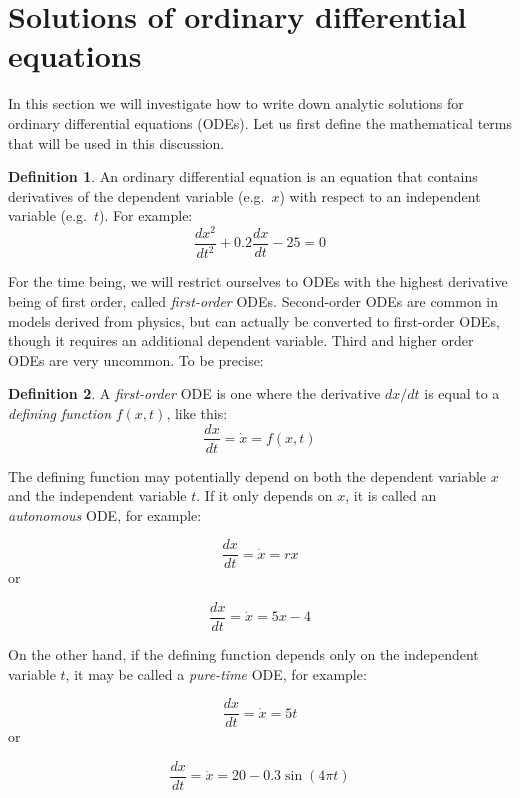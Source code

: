 \documentclass[
]{book}
\theoremstyle{definition}
\newtheorem{definition}{Definition}[chapter]
\theoremstyle{definition}
\theoremstyle{definition}
\theoremstyle{remark}
\begin{document}
\hypertarget{solutions-of-ordinary-differential-equations}{%
\section{Solutions of ordinary differential equations}\label{solutions-of-ordinary-differential-equations}}

\label{sec:math15}

In this section we will investigate how to write down analytic solutions for ordinary differential equations (ODEs). Let us first define the mathematical terms that will be used in this discussion.

\begin{definition}
\protect\hypertarget{def:def-ode}{}{\label{def:def-ode} }An ordinary differential equation is an equation that contains derivatives of the  dependent variable (e.g.~\(x\)) with respect to an independent variable (e.g.~\(t\)). For example:
\[ \frac{dx^2}{dt^2}+ 0.2 \frac{dx}{dt} - 25 = 0 \]
\end{definition}

For the time being, we will restrict ourselves to ODEs with the highest derivative being of first order, called \emph{first-order} ODEs. Second-order ODEs are common in models derived from physics, but can actually be converted to first-order ODEs, though it requires an additional dependent variable. Third and higher order ODEs are very uncommon. To be precise:
\begin{definition}
\protect\hypertarget{def:def-firstode}{}{\label{def:def-firstode} }A \emph{first-order} ODE is one where the derivative \(dx/dt\) is equal to a \emph{defining function} \(f(x,t)\), like this:
\[\frac{dx} {dt} = \dot x = f(x,t)\]
\end{definition}

The defining function may potentially depend on both the dependent variable \(x\) and the  independent variable \(t\). If it only depends on \(x\), it is called an \emph{autonomous} ODE, for example:

\[ \frac{dx}{dt} = \dot x = rx \]
or

\[\frac{dx}{dt} = \dot x = 5x -4\]

On the other hand, if the defining function depends only on the independent variable \(t\), it may be called a \emph{pure-time} ODE, for example:

\[ 
\frac{dx}{dt} = \dot x = 5t
\]
or

\[
\frac{dx}{dt} = \dot x = 20 - 0.3 \sin(4 \pi t)
\]
\end{document}
